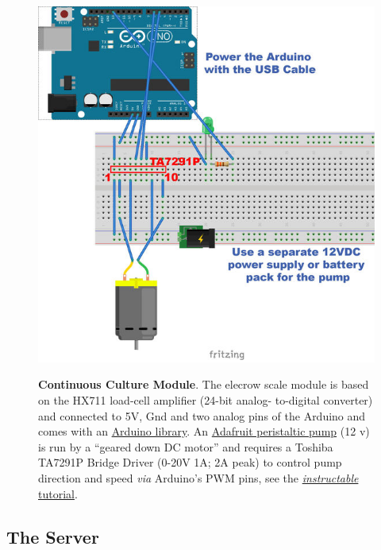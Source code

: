 \documentclass[12pt,a4paper]{scrartcl}
\begin{document}
\begin{figure}[ht]
\begin{minipage}{.5\textwidth}
{      \includegraphics[width=\textwidth]{figures/pump_fritzing.png}
    }
  \end{minipage}
\caption[]{\textbf{Continuous Culture Module}. The elecrow scale
  module is based on the HX711 load-cell amplifier (24-bit analog-
  to-digital converter) and connected to 5V, Gnd and two analog pins
  of the Arduino and comes with an
  \href{http://www.elecrow.com/wiki/index.php?title=Weight_Sensor_Scales_Kit-_20KG}{Arduino
    library}. An \href{https://www.adafruit.com/product/1150}{Adafruit
    peristaltic pump} (12 v) is run by a ``geared down DC motor'' and
  requires a Toshiba TA7291P Bridge Driver (0-20V 1A; 2A peak) to
  control pump direction and speed \textit{via} Arduino's PWM pins,
  see the
  \href{http://www.instructables.com/id/Control-peristaltic-pump-with-TA7291P-and-an-Ardui/}{\textit{instructable}
    tutorial}.}
\end{figure}

\clearpage
\subsection{The Server}
\end{document}
